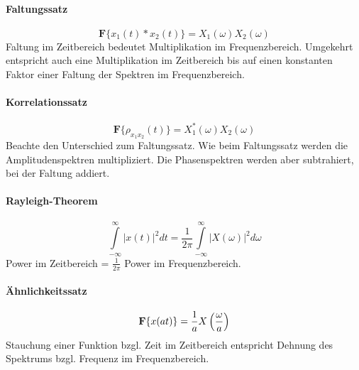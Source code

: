 \paragraph{Faltungssatz} 
\begin{equation}
\textbf{F} \{x_1(t) \ast x_2(t)\}= X_1(\omega) X_2(\omega)
\end{equation}
Faltung im Zeitbereich bedeutet Multiplikation im Frequenzbereich. Umgekehrt entspricht auch eine Multiplikation im Zeitbereich bis auf einen konstanten Faktor einer Faltung der Spektren im Frequenzbereich.

\paragraph{Korrelationssatz}
\begin{equation}
\textbf{F} \{\rho_{x_1x_2}(t)\}= X_1^\ast(\omega) X_2(\omega)
\end{equation}
Beachte den Unterschied zum Faltungssatz. Wie beim Faltungssatz werden die Amplitudenspektren multipliziert. Die Phasenspektren werden aber subtrahiert, bei der Faltung addiert.

\paragraph{Rayleigh-Theorem}
\begin{equation}
\int\limits_{-\infty}^{\infty} | x(t) |^2 dt = \frac{1}{2\pi} \int\limits_{-\infty}^{\infty} | X(\omega)|^2 d\omega
\end{equation}
Power im Zeitbereich = $\frac{1}{2\pi}$ Power im Frequenzbereich.

\paragraph{Ähnlichkeitssatz}
\begin{equation}
{\bf F} \{x(at)\}= \frac{1}{a} X\left(\frac{\omega}{a}\right)
\end{equation}
Stauchung einer Funktion bzgl. Zeit im Zeitbereich entspricht Dehnung des Spektrums bzgl. Frequenz im Frequenzbereich.


